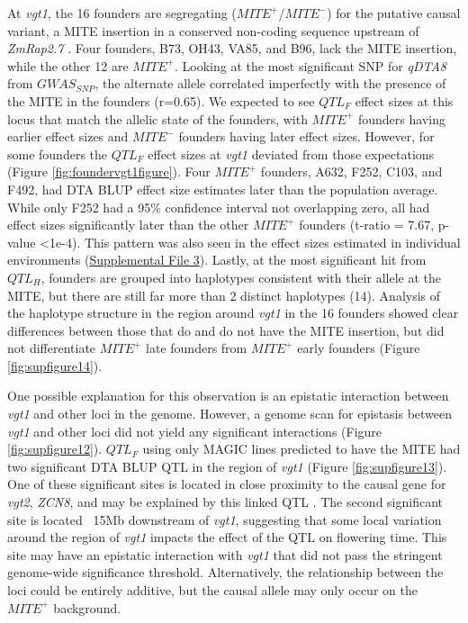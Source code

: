 \documentclass[9pt,twocolumn,twoside]{gsag3jnl}
\begin{document}
At \emph{vgt1}, the 16 founders are segregating ($MITE^+$/$MITE^-$) for the putative causal variant, a MITE insertion in a conserved non-coding sequence upstream of \emph{ZmRap2.7} \citep{Salvi,Castelletti}.
Four founders, B73, OH43, VA85, and B96, lack the MITE insertion, while the other 12 are $MITE^+$.
Looking at the most significant SNP for \emph{qDTA8} from $GWAS_{SNP}$, the alternate allele correlated imperfectly with the presence of the MITE in the founders (r=0.65).
We expected to see $QTL_F$ effect sizes at this locus that match the allelic state of the founders, with $MITE^+$ founders having earlier effect sizes and $MITE^-$ founders having later effect sizes.
However, for some founders the $QTL_F$ effect sizes at \emph{vgt1} deviated from those expectations (Figure \ref{fig:foundervgt1figure}).
Four $MITE^+$ founders, A632, F252, C103, and F492, had DTA BLUP effect size estimates later than the population average.
While only F252 had a 95\% confidence interval not overlapping zero, all  had effect sizes significantly later than the other $MITE^+$ founders (t-ratio = 7.67, p-value <1e-4).
This pattern was also seen in the effect sizes estimated in individual environments (\href{run:figures/Methods_Supplemental3.pdf}{Supplemental File 3}).
Lastly, at the most significant hit from $QTL_H$, founders are grouped into haplotypes consistent with their allele at the MITE, but there are still far more than 2 distinct haplotypes (14).
Analysis of the haplotype structure in the region around \emph{vgt1} in the 16 founders showed clear differences between those that do and do not have the MITE insertion, but did not differentiate $MITE^+$ late founders from $MITE^+$ early founders (Figure \ref{fig:supfigure14}).

One possible explanation for this observation is an epistatic interaction between \emph{vgt1} and other loci in the genome.
However, a genome scan for epistasis between \emph{vgt1} and other loci did not yield any significant interactions (Figure \ref{fig:supfigure12}).
$QTL_F$ using only MAGIC lines predicted to have the MITE had two significant DTA BLUP QTL in the region of \emph{vgt1} (Figure \ref{fig:supfigure13}).
One of these significant sites is located in close proximity to the causal gene for \emph{vgt2}, \emph{ZCN8}, and may be explained by this linked QTL \citep{Guo}.
The second significant site is located ~15Mb downstream of \emph{vgt1}, suggesting that some local variation around the region of \emph{vgt1} impacts the effect of the QTL on flowering time.
This site may have an epistatic interaction with \emph{vgt1} that did not pass the stringent genome-wide significance threshold.
Alternatively, the relationship between the loci could be entirely additive, but the causal allele may only occur on the $MITE^+$ background.
\end{document}
